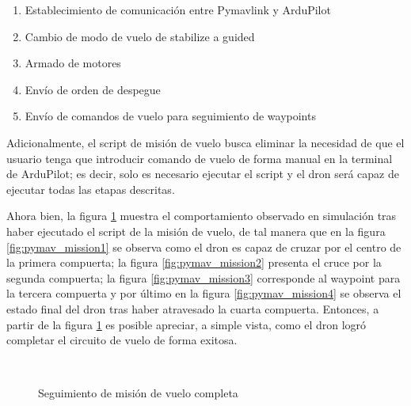\begin{enumerate}
    \item Establecimiento de comunicación entre Pymavlink y ArduPilot
    \item Cambio de modo de vuelo de stabilize a guided
    \item Armado de motores
    \item Envío de orden de despegue
    \item Envío de comandos de vuelo para seguimiento de waypoints
\end{enumerate}

Adicionalmente, el script de misión de vuelo busca eliminar la necesidad de que el usuario tenga que introducir comando de vuelo de forma manual en la terminal de ArduPilot; es decir, solo es necesario ejecutar el script y el dron será capaz de ejecutar todas las etapas descritas.

Ahora bien, la figura \ref{fig:pymav_mission} muestra el comportamiento observado en simulación tras haber ejecutado el script de la misión de vuelo, de tal manera que en la figura \ref{fig:pymav_mission1} se observa como el dron es capaz de cruzar por el centro de la primera compuerta; la figura \ref{fig:pymav_mission2} presenta el cruce por la segunda compuerta; la figura \ref{fig:pymav_mission3} corresponde al waypoint para la tercera compuerta y por último en la figura \ref{fig:pymav_mission4} se observa el estado final del dron tras haber atravesado la cuarta compuerta. Entonces, a partir de la figura \ref{fig:pymav_mission} es posible apreciar, a simple vista, como el dron logró completar el circuito de vuelo de forma exitosa.  

\begin{figure}[ht]
    \centering
    \hfill
    \\
    \hfill
    \hfill

    \caption{Seguimiento de misión de vuelo completa}
    \label{fig:pymav_mission}
\end{figure}

